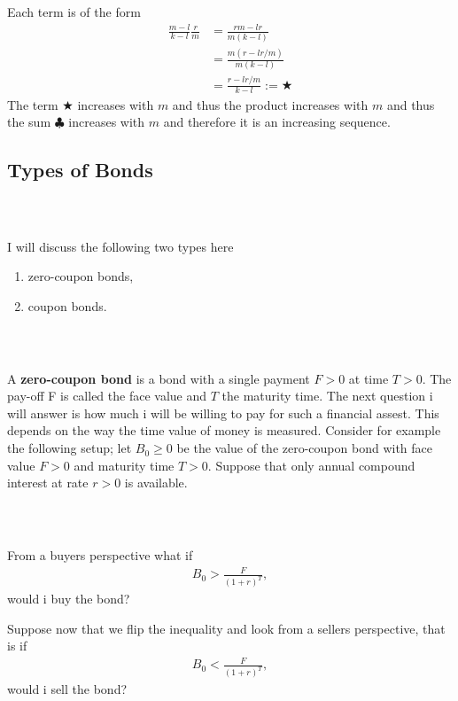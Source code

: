\documentclass{beamer}
\numberwithin{equation}{section}
\begin{document}
\begin{frame}\frametitle{{\normalsize \secname} \\ {\large \subsecname}}
    Each term is of the form
    \begin{align*}
        \frac{m-l}{k-l} \frac{r}{m} &= \frac{rm - lr}{m(k-l)}\\
        &= \frac{m(r - lr/m)}{m(k - l)}\\
        &= \frac{r - lr/m}{k-l} := \bigstar
    \end{align*}
    The term $\bigstar$ increases with $m$ and thus the product increases with $m$ and thus the sum $\clubsuit$ increases with $m$ and therefore it is an increasing sequence.
\end{frame}

\subsection{Types of Bonds}

\begin{frame}\frametitle{{\normalsize \secname} \\ {\large \subsecname}}
    I will discuss the following two types here
    \begin{enumerate}
        \item zero-coupon bonds,
        \item coupon bonds.
    \end{enumerate}
\end{frame}

\begin{frame}\frametitle{{\normalsize \secname} \\ {\large \subsecname}}
    A \textbf{zero-coupon bond} is a bond with a single payment $F > 0$ at time $T > 0$.
    The pay-off F is called the face value and $T$ the maturity time.
    The next question i will answer is how much i will be willing to pay for such a financial assest.
    This depends on the way the time value of money is measured.
    Consider for example the following setup; let $B_0 \geq 0$ be the value of the zero-coupon bond with face value $F>0$ and maturity time $T>0$.
    Suppose that only annual compound interest at rate $r>0$ is available.
\end{frame}

\begin{frame}\frametitle{{\normalsize \secname} \\ {\large \subsecname}}
    From a buyers perspective what if
    \begin{align}\label{eq:zero_coupon_bond_example}
        B_0 > \frac{F}{(1 + r)^T},
    \end{align}
    would i buy the bond?
    \pause
    
    Suppose now that we flip the inequality and look from a sellers perspective, that is if
    \begin{align}\label{eq:zero_coupon_bond_example_seller}
        B_0 < \frac{F}{(1 + r)^T},
    \end{align}
    would i sell the bond?
\end{frame}
\end{document}
